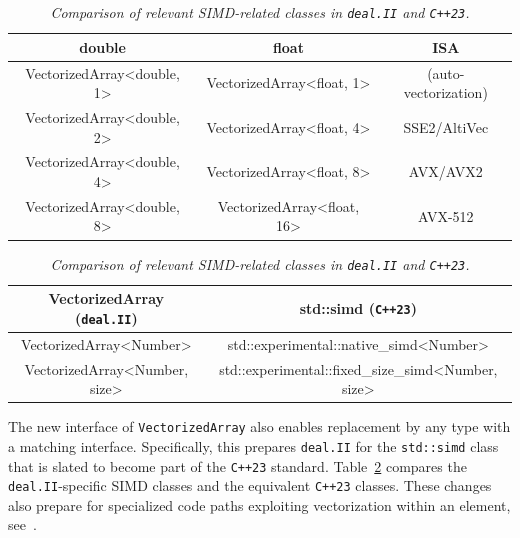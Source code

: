 \documentclass{ansarticle-preprint}
\newcommand{\specialword}[1]{\texttt{#1}}
\newcommand{\dealii}{{\specialword{deal.II}}\xspace}
\begin{document}
\begin{table}
\caption{\it Supported vector lengths of the class \texttt{VectorizedArray} and
the corresponding instruction-set-architecture extensions. }\label{tab:vectorizedarray}
\centering
\begin{tabular}{ccc}
\toprule
\textbf{double} & \textbf{float} & \textbf{ISA}\\
\midrule
VectorizedArray<double, 1> & VectorizedArray<float, 1> & (auto-vectorization) \\
VectorizedArray<double, 2> & VectorizedArray<float, 4> & SSE2/AltiVec \\
VectorizedArray<double, 4> & VectorizedArray<float, 8> & AVX/AVX2 \\
VectorizedArray<double, 8> & VectorizedArray<float, 16> & AVX-512 \\
\bottomrule
\end{tabular}

\caption{\it Comparison of relevant SIMD-related classes in \dealii{} and \texttt{C++23}.}\label{tab:simd}
\centering
\begin{tabular}{cc}
\toprule
\textbf{VectorizedArray (\dealii{})} & \textbf{std::simd (\texttt{C++23})} \\
\midrule
VectorizedArray<Number> & std::experimental::native\_simd<Number> \\
VectorizedArray<Number, size> & std::experimental::fixed\_size\_simd<Number, size> \\ \bottomrule
\end{tabular}
\end{table}

The new interface of \texttt{VectorizedArray} also enables replacement
by any type with a matching interface. Specifically, this prepares
\dealii{} for the \texttt{std::simd} class that is slated to become
part of the \texttt{C++23} standard.
Table~\ref{tab:simd} compares the \dealii{}-specific SIMD classes and
the equivalent \texttt{C++23} classes. These changes also prepare for specialized
code paths exploiting
vectorization within an element, see~\cite{KronbichlerKormann2019}.

\end{document}
